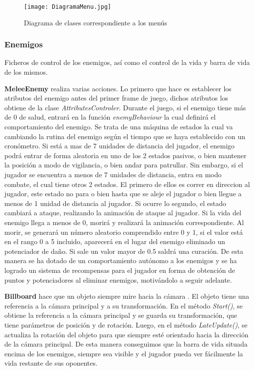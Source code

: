 \begin{figure}[H]
    \centering
    \texttt{[image: DiagramaMenu.jpg]}
    \caption{Diagrama de clases correspondiente a los menús}
\end{figure}

\subsubsection{Enemigos}

Ficheros de control de los enemigos, así como el control de la vida y barra de vida de los mismos.

\textbf{MeleeEnemy} realiza varias acciones. Lo primero que hace es establecer los atributos del enemigo antes del primer frame de juego, dichos atributos los obtiene de la clase \textit{AttributesControler}. Durante el juego, si el enemigo tiene más de 0 de salud, entrará en la función \textit{enemyBehaviour} la cual definirá el comportamiento del enemigo. Se trata de una máquina de estados la cual va cambiando la rutina del enemigo según el tiempo que se haya establecido con un cronómetro. Si está a mas de 7 unidades de distancia del jugador, el enemigo podrá entrar de forma aleatoria en uno de los 2 estados pasivos, o bien mantener la posición a modo de vigilancia, o bien andar para patrullar. Sin embargo, si el jugador se encuentra a menos de 7 unidades de distancia, entra en modo combate, el cual tiene otros 2 estados. El primero de ellos es correr en direccion al jugador, este estado no para o bien hasta que se aleje el jugador o bien llegue a menos de 1 unidad de distancia al jugador. Si ocurre lo segundo, el estado cambiará a ataque, realizando la animación de ataque al jugador. Si la vida del enemigo llega a menos de 0, morirá y realizará la animación correspondiente. Al morir, se generará un número aleatorio comprendido entre 0 y 1, si el valor está en el rango 0 a 5 incluido, aparecerá en el lugar del enemigo eliminado un potenciador  de daño. Si sale un valor mayor de 0.5 saldrá una curación. De esta manera se ha dotado de un comportamiento autónomo a los enemigos y se ha logrado un sistema de recompensas para el jugador en forma de obtención de puntos y potenciadores al eliminar enemigos, motivándolo a seguir adelante.

\textbf{Billboard} hace que un objeto siempre mire hacia la cámara . El objeto tiene una referencia a la cámara principal y a su transformación. En el método \textit{Start()}, se obtiene la referencia a la cámara principal y se guarda su transformación, que tiene parámetros de posición y de rotación. Luego, en el método \textit{LateUpdate()}, se actualiza la rotación del objeto para que siempre esté orientado hacia la dirección de la cámara principal. De esta manera conseguimos que la barra de vida situada encima de los enemigos, siempre sea visible y el jugador pueda ver fácilmente la vida restante de sus oponentes.

